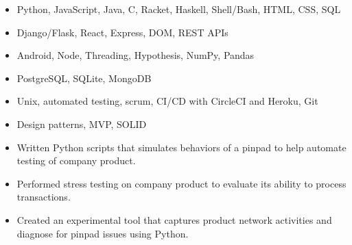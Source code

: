 \documentclass[10pt,a4paper]{altacv}
\begin{document}

\begin{fullwidth}
\makecvheader
\end{fullwidth}


\marginpar{\vspace*{-85pt}\raggedright}




\begin{itemize}
  \item Python, JavaScript, Java, C, Racket, Haskell, Shell/Bash, HTML, CSS, SQL
\end{itemize}

\vspace{5pt}


\begin{itemize}
  \item Django/Flask, React, Express, DOM, REST APIs
  \item Android, Node, Threading, Hypothesis, NumPy, Pandas
  \item PostgreSQL, SQLite, MongoDB
  \item Unix, automated testing, scrum, CI/CD with CircleCI and Heroku, Git
  \item Design patterns, MVP, SOLID
\end{itemize}



\begin{itemize}
\item Written Python scripts that simulates behaviors of a pinpad to help automate testing of company product.
\item Performed stress testing on company product to evaluate its ability to process transactions.
\item Created an experimental tool that captures product network activities and diagnose for pinpad issues using Python.
\end{itemize}
\end{document}
